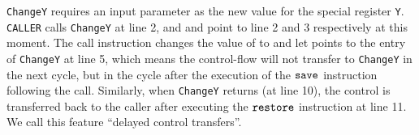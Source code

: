
\texttt{ChangeY} requires an input parameter
as the new value for the special register {\tt Y}.
\texttt{CALLER} calls \texttt{ChangeY} at line 2,
and \pc{} and \npc{} point to line 2 and 3 respectively at this
moment.
The call instruction changes the value of \pc{} to \npc{}
and let \npc{} points to the entry of
\texttt{ChangeY} at line 5,
which means the control-flow will not transfer to \texttt{ChangeY}
in the next cycle,
but in the cycle after the execution of the $\texttt{save}$
instruction following the call. Similarly, when
\texttt{ChangeY} returns (at line 10), the control is transferred
back to the caller after executing the $\texttt{restore}$
instruction at line 11.
We call this feature ``delayed control transfers''.

